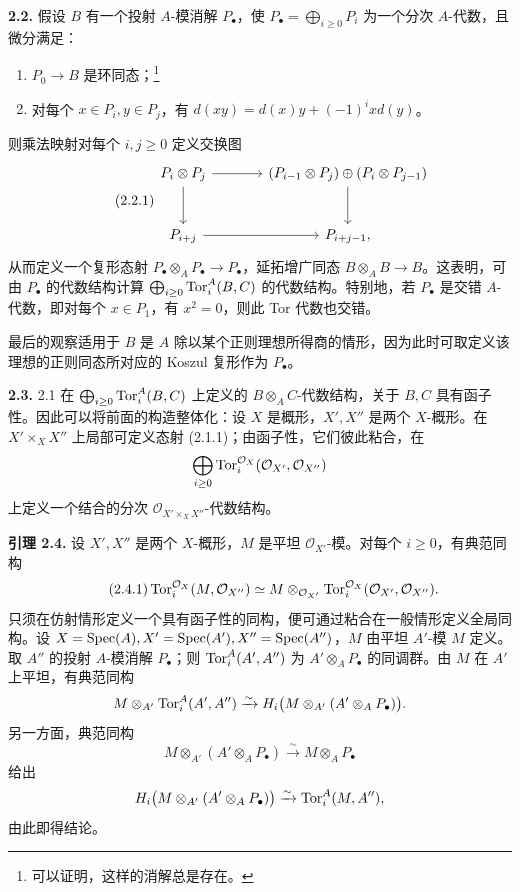 \textbf{2.2.} 假设 \(B\) 有一个投射 \(A\)-模消解 \(P_\bullet\)，使 \(P_\bullet=\bigoplus_{i\geq0}P_i\) 为一个分次 \(A\)-代数，且微分满足：
\begin{enumerate}[label=\textup{\alph*)}]
\item \(P_0\to B\) 是环同态；\footnote{可以证明，这样的消解总是存在。}
\item 对每个 \(x\in P_i,y\in P_j\)，有 \(d(xy)=d(x)y+(-1)^ixd(y)\)。
\end{enumerate}
则乘法映射对每个 \(i,j\geq0\) 定义交换图
\begin{equation}\tag{2.2.1}
\begin{tikzcd}[column sep=large,row sep=large]
P_i\otimes P_j \arrow[r] \arrow[d] & (P_{i-1}\otimes P_j)\oplus(P_i\otimes P_{j-1}) \arrow[d]\\
P_{i+j} \arrow[r] & P_{i+j-1},
\end{tikzcd}
\end{equation}
从而定义一个复形态射 \(P_\bullet\otimes_A P_\bullet\to P_\bullet\)，延拓增广同态 \(B\otimes_A B\to B\)。这表明，可由 \(P_\bullet\) 的代数结构计算
\(\bigoplus_{i\geq0}\operatorname{Tor}_i^A(B,C)\) 的代数结构。特别地，若 \(P_\bullet\) 是交错 \(A\)-代数，即对每个 \(x\in P_1\)，有 \(x^2=0\)，则此 Tor 代数也交错。

最后的观察适用于 \(B\) 是 \(A\) 除以某个正则理想所得商的情形，因为此时可取定义该理想的正则同态所对应的 Koszul 复形作为 \(P_\bullet\)。

\textbf{2.3.} 2.1 在
\(\bigoplus_{i\geq0}\operatorname{Tor}_i^A(B,C)\) 上定义的 \(B\otimes_A C\)-代数结构，关于 \(B,C\) 具有函子性。因此可以将前面的构造整体化：设 \(X\) 是概形，\(X',X''\) 是两个 \(X\)-概形。在 \(X'\times_X X''\) 上局部可定义态射 (2.1.1)；由函子性，它们彼此粘合，在
\[
 \bigoplus_{i\geq0}\operatorname{Tor}_i^{\mathcal O_X}(\mathcal O_{X'},\mathcal O_{X''})
\]
上定义一个结合的分次 \(\mathcal O_{X'\times_X X''}\)-代数结构。

\textbf{引理 2.4.} 设 \(X',X''\) 是两个 \(X\)-概形，\(M\) 是平坦 \(\mathcal O_{X'}\)-模。对每个 \(i\geq0\)，有典范同构
\begin{equation}\tag{2.4.1}
 \operatorname{Tor}_i^{\mathcal O_X}(M,\mathcal O_{X''})
 \simeq M\otimes_{\mathcal O_{X'}}
         \operatorname{Tor}_i^{\mathcal O_X}(\mathcal O_{X'},\mathcal O_{X''}).
\end{equation}
只须在仿射情形定义一个具有函子性的同构，便可通过粘合在一般情形定义全局同构。设
\(X=\operatorname{Spec}(A),X'=\operatorname{Spec}(A'),X''=\operatorname{Spec}(A'')\)，\(M\) 由平坦 \(A'\)-模 \(M\) 定义。取 \(A''\) 的投射 \(A\)-模消解 \(P_\bullet\)；则
\(\operatorname{Tor}_i^A(A',A'')\) 为 \(A'\otimes_A P_\bullet\) 的同调群。由 \(M\) 在 \(A'\) 上平坦，有典范同构
\[
 M\otimes_{A'}\operatorname{Tor}_i^A(A',A'')
 \xrightarrow{\sim}H_i\bigl(M\otimes_{A'}(A'\otimes_A P_\bullet)\bigr).
\]
另一方面，典范同构
\[
 M\otimes_{A'}(A'\otimes_A P_\bullet)\xrightarrow{\sim}M\otimes_A P_\bullet
\]
给出
\[
 H_i\bigl(M\otimes_{A'}(A'\otimes_A P_\bullet)\bigr)
 \xrightarrow{\sim}\operatorname{Tor}_i^A(M,A''),
\]
由此即得结论。

